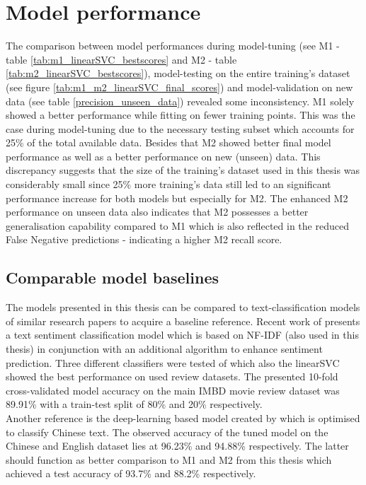 \section{Model performance} \label{disussion_model_performance}
The comparison between model performances during model-tuning (see M1 - table \ref{tab:m1_linearSVC_bestscores} and M2 - table \ref{tab:m2_linearSVC_bestscores}), model-testing on the entire training's dataset (see figure \ref{tab:m1_m2_linearSVC_final_scores}) and model-validation on new data (see table \ref{precision_unseen_data}) revealed some inconsistency. M1 solely showed a better performance while fitting on fewer training points. This was the case during model-tuning due to the necessary testing subset which accounts for 25\% of the total available data. Besides that M2 showed better final model performance as well as a better performance on new (unseen) data. This discrepancy suggests that the size of the training's dataset used in this thesis was considerably small since 25\% more training's data still led to an significant performance increase for both models but especially for M2. The enhanced M2 performance on unseen data also indicates that M2 possesses a better generalisation capability compared to M1 which is also reflected in the reduced False Negative predictions - indicating a higher M2 recall score.

\subsection*{Comparable model baselines} \label{model_baseline}
The models presented in this thesis can be compared to text-classification models of similar research papers to acquire a baseline reference. Recent work of \textcite{Das2018} presents a text sentiment classification model which is based on NF-IDF (also used in this thesis) in conjunction with an additional algorithm to enhance sentiment prediction. Three different classifiers were tested of which also the linearSVC showed the best performance on used review datasets. The presented 10-fold cross-validated model accuracy on the main IMBD movie review dataset was 89.91\% with a train-test split of 80\% and 20\% respectively.\\
Another reference is the deep-learning based model created by \textcite{Li2018} which is optimised to classify Chinese text. The observed accuracy of the tuned model on the Chinese and English dataset lies at 96.23\% and 94.88\% respectively. The latter should function as better comparison to M1 and M2 from this thesis which achieved a test accuracy of 93.7\% and 88.2\% respectively.

